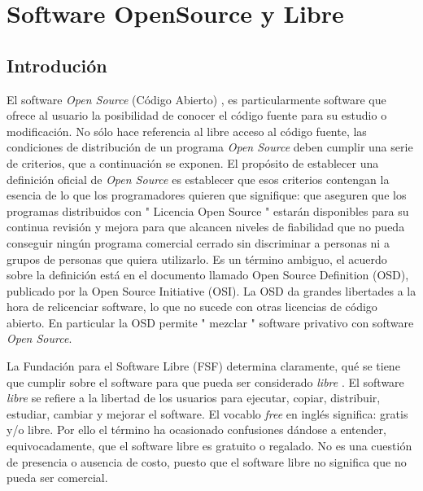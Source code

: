 \chapter{Software OpenSource y Libre}
\section{Introdución} 
	El software \textit{Open Source} (Código Abierto) , es particularmente software que ofrece al
	usuario la posibilidad de conocer el código fuente para su estudio o modificación. No sólo hace referencia al libre acceso al código fuente, las
	condiciones de distribución de un programa \textit{Open Source} deben cumplir una serie de criterios, que a continuación se exponen. El propósito de
	establecer una definición oficial de \textit{Open Source} es establecer que esos criterios contengan la esencia de lo que los programadores quieren que
	signifique: que aseguren que los programas distribuidos con " Licencia Open Source " estarán disponibles para su continua revisión y mejora para que
	alcancen niveles de fiabilidad que no pueda conseguir ningún programa comercial cerrado sin discriminar a personas ni a grupos de personas que
	quiera utilizarlo. Es un término ambiguo, el acuerdo sobre la definición está en el documento llamado Open Source Definition (OSD), publicado por la
	Open Source Initiative (OSI). La OSD da grandes libertades a la hora de relicenciar software, lo que no sucede con otras licencias de código
	abierto. En particular la OSD permite " mezclar " software privativo con software \textit{Open Source}.
	
	La Fundación para el Software Libre (FSF) determina claramente, qué se tiene que cumplir sobre el software para que pueda ser considerado
	\textit{libre} \cite{Etiqueta07}. El software \textit{libre} se refiere a la libertad de los usuarios para ejecutar, copiar, distribuir, estudiar,
	cambiar y mejorar el software. El vocablo \textit{free} en inglés significa: gratis y/o libre. Por ello el término ha ocasionado confusiones dándose
	a entender, equivocadamente, que el software libre es gratuito o regalado. No es una cuestión de presencia o ausencia de costo, puesto que el
	software libre no significa que no pueda ser comercial.
	
